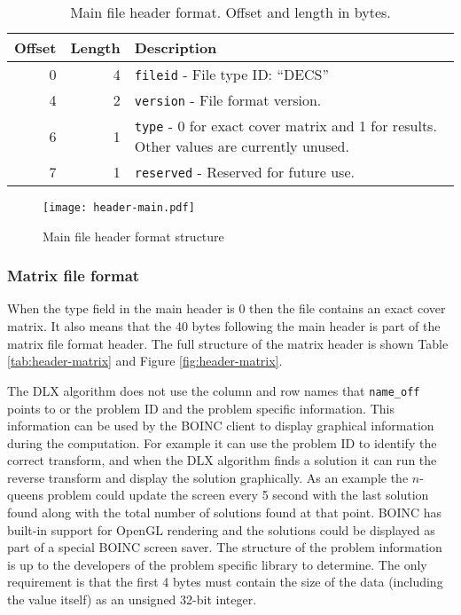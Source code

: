 
\begin{table}[htbp]
	\centering
	\begin{tabular}{|r|r|p{3.1in}|}
		\hline
		\bf Offset & \bf Length & \bf Description \\ \hline
		0  & 4 & \texttt{fileid} - File type ID: ``DECS'' \\ \hline
		4  & 2 & \texttt{version} - File format version. \\ \hline
		6  & 1 & \texttt{type} - 0 for exact cover matrix and 1 for results. Other values are currently unused. \\ \hline
		7  & 1 & \texttt{reserved} - Reserved for future use. \\ \hline
	\end{tabular}
	\caption{Main file header format. Offset and length in bytes.}
	\label{tab:header-main}
\end{table}

\begin{figure}[htbp]
	\centering
	\texttt{[image: header-main.pdf]}
	\caption{Main file header format structure}
	\label{fig:header-main}
\end{figure}


\subsubsection{Matrix file format}

When the type field in the main header is 0 then the file contains an exact cover matrix.
It also means that the 40 bytes following the main header is part of the matrix file format header.
The full structure of the matrix header is shown Table \ref{tab:header-matrix} and Figure \ref{fig:header-matrix}.

The DLX algorithm does not use the column and row names that \texttt{name\_off} points to or the problem ID and the problem specific information.
This information can be used by the BOINC client to display graphical information during the computation.
For example it can use the problem ID to identify the correct transform, and when the DLX algorithm finds a solution it can run the reverse transform and display the solution graphically.
As an example the $n$-queens problem could update the screen every 5 second with the last solution found along with the total number of solutions found at that point.
BOINC has built-in support for OpenGL rendering and the solutions could be displayed as part of a special BOINC screen saver.
The structure of the problem information is up to the developers of the problem specific library to determine.
The only requirement is that the first 4 bytes must contain the size of the data (including the value itself) as an unsigned 32-bit integer.

